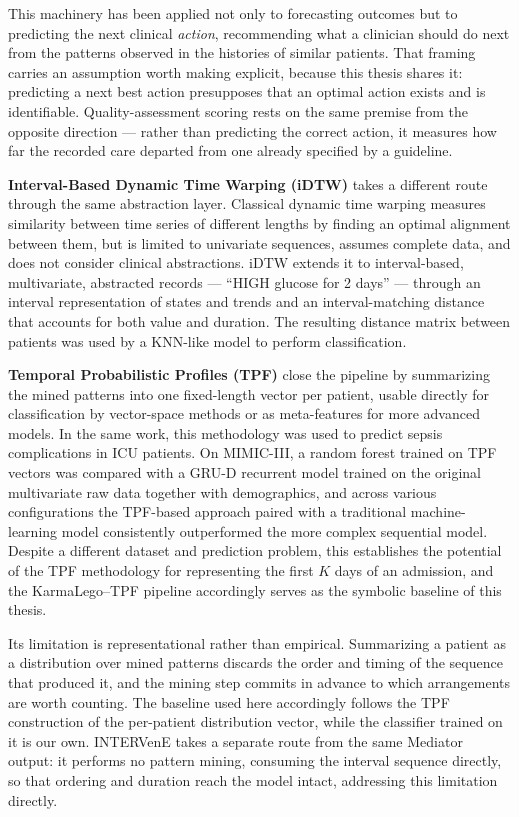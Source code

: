 This machinery has been applied not only to forecasting outcomes but to predicting the next clinical \emph{action}, recommending what a clinician should do next from the patterns observed in the histories of similar patients. That framing carries an assumption worth making explicit, because this thesis shares it: predicting a next best action presupposes that an optimal action exists and is identifiable. Quality-assessment scoring rests on the same premise from the opposite direction --- rather than predicting the correct action, it measures how far the recorded care departed from one already specified by a guideline.

\textbf{Interval-Based Dynamic Time Warping (iDTW)} \citep{implementation-evaluation-multivariate-abstraction-based-interval-based-dtw} takes a different route through the same abstraction layer. Classical dynamic time warping measures similarity between time series of different lengths by finding an optimal alignment between them, but is limited to univariate sequences, assumes complete data, and does not consider clinical abstractions. iDTW extends it to interval-based, multivariate, abstracted records --- ``HIGH glucose for 2 days'' --- through an interval representation of states and trends and an interval-matching distance that accounts for both value and duration. The resulting distance matrix between patients was used by a KNN-like model to perform classification.

\textbf{Temporal Probabilistic Profiles (TPF)} \citep{sheetrit2019tpf} close the pipeline by summarizing the mined patterns into one fixed-length vector per patient, usable directly for classification by vector-space methods or as meta-features for more advanced models. In the same work, this methodology was used to predict sepsis complications in ICU patients. On MIMIC-III, a random forest trained on TPF vectors was compared with a GRU-D recurrent model \citep{che2018recurrent} trained on the original multivariate raw data together with demographics, and across various configurations the TPF-based approach paired with a traditional machine-learning model consistently outperformed the more complex sequential model. Despite a different dataset and prediction problem, this establishes the potential of the TPF methodology for representing the first $K$ days of an admission, and the KarmaLego--TPF pipeline accordingly serves as the symbolic baseline of this thesis.

Its limitation is representational rather than empirical. Summarizing a patient as a distribution over mined patterns discards the order and timing of the sequence that produced it, and the mining step commits in advance to which arrangements are worth counting. The baseline used here accordingly follows the TPF construction of the per-patient distribution vector, while the classifier trained on it is our own. INTERVenE takes a separate route from the same Mediator output: it performs no pattern mining, consuming the interval sequence directly, so that ordering and duration reach the model intact, addressing this limitation directly.

